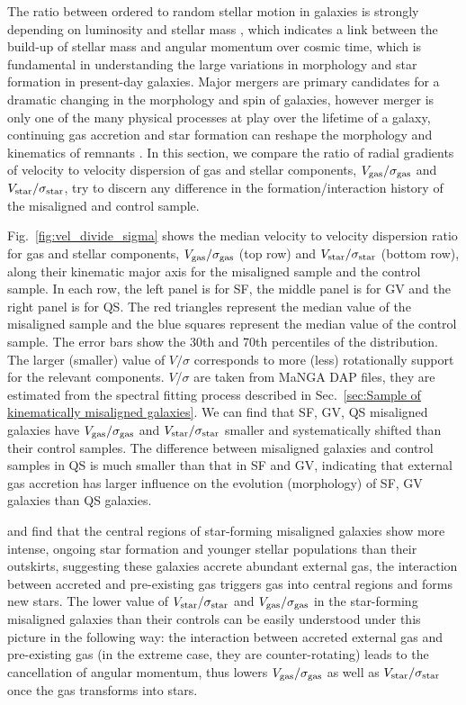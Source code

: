 The ratio between ordered to random stellar motion in galaxies is strongly depending on luminosity and stellar mass \citep{veale_massive_2017, green_sami_2018}, which indicates a link between the build-up of stellar mass and angular momentum over cosmic time, which is fundamental in understanding the large variations in morphology and star formation in present-day galaxies. Major mergers are primary candidates for a dramatic changing in the morphology and spin of galaxies, however merger is only one of the many physical processes at play over the lifetime of a galaxy, continuing gas accretion and star formation can reshape the morphology and kinematics of remnants \citep{naab_atlas3d_2014}. In this section, we compare the ratio of radial gradients of velocity to velocity dispersion of gas and stellar components, $V_{\rm gas}/{\sigma}_{\rm gas}$ and $V_{\rm star}/{\sigma}_{\rm star}$, try to discern any difference in the formation/interaction history of the misaligned and control sample.

Fig.~\ref{fig:vel_divide_sigma} shows the median velocity to velocity dispersion ratio for gas and stellar components, $V_{\rm gas}/{\sigma}_{\rm gas}$ (top row) and $V_{\rm star}/{\sigma}_{\rm star}$ (bottom row), along their kinematic major axis for the misaligned sample and the control sample. In each row, the left panel is for SF, the middle panel is for GV and the right panel is for QS. The red triangles represent the median value of the misaligned sample and the blue squares represent the median value of the control sample. The error bars show the 30th and 70th percentiles of the distribution. The larger (smaller) value of $V/\sigma$ corresponds to more (less) rotationally support for the relevant components. $V$/$\sigma$ are taken from MaNGA DAP files, they are estimated from the spectral fitting process described in Sec.~\ref{sec:Sample of kinematically misaligned galaxies}. We can find that SF, GV, QS misaligned galaxies have $V_{\rm gas}/{\sigma}_{\rm gas}$ and $V_{\rm star}/{\sigma}_{\rm star}$ smaller and systematically shifted than their control samples. The difference between misaligned galaxies and control samples in QS is much smaller than that in SF and GV, indicating that external gas accretion has larger influence on the evolution (morphology) of SF, GV galaxies than QS galaxies.

\citet{chen_growth_2016} and \citet{jin_sdss-iv_2016} find that the central regions of star-forming misaligned galaxies show more intense, ongoing star formation and younger stellar populations than their outskirts, suggesting these galaxies accrete abundant external gas, the interaction between accreted and pre-existing gas triggers gas into central regions and forms new stars. The lower value of $V_{\rm star}/{\sigma}_{\rm star}$ and $V_{\rm gas}/{\sigma}_{\rm gas}$ in the star-forming misaligned galaxies than their controls can be easily understood under this picture in the following way: the interaction between accreted external gas and pre-existing gas (in the extreme case, they are counter-rotating) leads to the cancellation of angular momentum, thus lowers $V_{\rm gas}/{\sigma}_{\rm gas}$ as well as $V_{\rm star}/{\sigma}_{\rm star}$ once the gas transforms into stars. 

